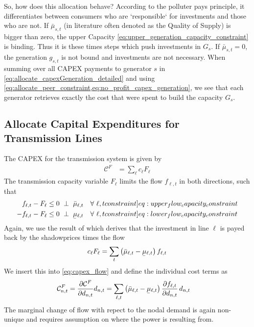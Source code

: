 \documentclass[11pt,twocolumn]{article}
\newcommand{\ubar}[1]{\underaccent{\bar}{#1}}
\newcommand{\resultsin}[1]{\hspace{6pt} \bot  \hspace{6pt} #1}
\newcommand{\Forall}[1]{\hspace{10pt} \forall \,\, #1 }
\newcommand{\pdv}[2]{\frac{\partial #1}{\partial #2}}
\newcommand{\generation}{g_{s,t}}
\newcommand{\capacityGeneration}{G_{s}}
\newcommand{\capacityFlow}{F_{\ell}}
\newcommand{\capexFlow}{c_{\ell}}
\newcommand{\demand}[1][n]{d_{#1,t}}
\newcommand{\muuppergeneration}{\bar{\mu}_{s,t}}
\newcommand{\mulowerflow}{\ubar{\mu}_{\ell,t}}
\newcommand{\muupperflow}{\bar{\mu}_{\ell,t}}
\newcommand{\flow}{f_{\ell,t}}
\newcommand{\allocateCapexFlow}[1][n]{\mathcal{C}^{F}_{#1,t}}
\newcommand{\totalCapexFlow}{\mathcal{C}^F}
\begin{document}
So, how does this allocation behave? According to the polluter pays principle, it differentiates between consumers who are `responsible` for investments and those who are not. If $\muuppergeneration$ (in literature often denoted as the Quality of Supply) is bigger than zero, the upper Capacity \cref{eq:upper_generation_capacity_constraint} is binding. Thus it is these times steps which push investments in $\capacityGeneration$. If $\muuppergeneration = 0$, the generation $\generation$ is not bound and investments are not necessary. 
When summing over all CAPEX payments to generator $s$ in \cref{eq:allocate_capexGeneration_detailed} and using \cref{eq:allocate_peer_constraint,eq:no_profit_capex_generation}, we see that each generator retrieves exactly the cost that were spent to build the capacity $\capacityGeneration$.
 

\subsection{Allocate Capital Expenditures for Transmission Lines}


The CAPEX for the transmission system is given by 
\begin{align}
 \totalCapexFlow & = \sum_\ell \capexFlow \capacityFlow
 \label{eq:capex_flow}
\end{align}
The transmission capacity variable $\capacityFlow$ limits the flow $\flow$ in both directions, such that 
\begin{align}
\flow - \capacityFlow &\le 0 \resultsin{\muupperflow} \Forall{\ell,t} 
\label[constraint]{eq:upper_flow_capacity_constraint} \\
- \flow - \capacityFlow &\le 0 \resultsin{\mulowerflow} \Forall{\ell,t} 
\label[constraint]{eq:lower_flow_capacity_constraint}
\end{align}
Again, we use the result of \cite{brown_decreasing_2020} which derives that the investment in line $\ell$ is payed back by the shadowprices times the flow 
\begin{align}
\capexFlow \capacityFlow = \sum_{t} \left( \muupperflow - \mulowerflow \right)  \flow 
\label{eq:no_profit_capex_flow}
\end{align}
We insert this into \cref{eq:capex_flow} and define the individual cost terms  as 
\begin{align}
\allocateCapexFlow = \pdv{\totalCapexFlow}{\demand}\demand & =  \sum_{\ell,t} \left( \muupperflow - \mulowerflow \right) \pdv{\flow}{\demand} \, \demand
\end{align}
The marginal change of flow with repect to the nodal demand is again non-unique and requires assumption on where the power is resulting from. 
\end{document}
